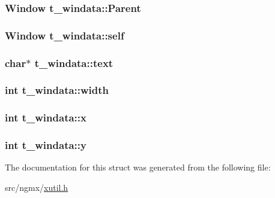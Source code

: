 \hypertarget{structt__windata_a3917555272c4789c94ac78ce6e094c4b}{
\subsubsection[{\-Parent}]{\setlength{\rightskip}{0pt plus 5cm}\-Window {\bf t\-\_\-windata\-::\-Parent}}}\label{structt__windata_a3917555272c4789c94ac78ce6e094c4b}
\hypertarget{structt__windata_a2f635b17bc6d3e0e352511a63ba8fff2}{
\subsubsection[{self}]{\setlength{\rightskip}{0pt plus 5cm}\-Window {\bf t\-\_\-windata\-::self}}}\label{structt__windata_a2f635b17bc6d3e0e352511a63ba8fff2}
\hypertarget{structt__windata_a29a26a33ccfb6d366e4131174a70c282}{
\subsubsection[{text}]{\setlength{\rightskip}{0pt plus 5cm}char$\ast$ {\bf t\-\_\-windata\-::text}}}\label{structt__windata_a29a26a33ccfb6d366e4131174a70c282}
\hypertarget{structt__windata_ad097c068786d4675810a6230b209ddb1}{
\subsubsection[{width}]{\setlength{\rightskip}{0pt plus 5cm}int {\bf t\-\_\-windata\-::width}}}\label{structt__windata_ad097c068786d4675810a6230b209ddb1}
\hypertarget{structt__windata_a36dc214ec73cc4317027191f095f0352}{
\subsubsection[{x}]{\setlength{\rightskip}{0pt plus 5cm}int {\bf t\-\_\-windata\-::x}}}\label{structt__windata_a36dc214ec73cc4317027191f095f0352}
\hypertarget{structt__windata_a7462d9c4b9b846b703c0530681517d80}{
\subsubsection[{y}]{\setlength{\rightskip}{0pt plus 5cm}int {\bf t\-\_\-windata\-::y}}}\label{structt__windata_a7462d9c4b9b846b703c0530681517d80}


\-The documentation for this struct was generated from the following file\-:\begin{DoxyCompactItemize}
\item 
src/ngmx/\hyperlink{xutil_8h}{xutil.\-h}\end{DoxyCompactItemize}
